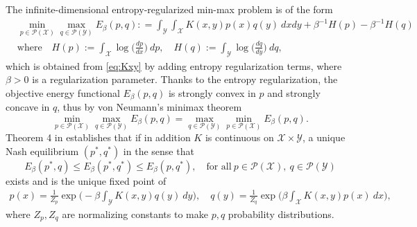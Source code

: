 \documentclass[11pt]{article}
\newcommand{\1}{\mathds{1}}
\begin{document}
The infinite-dimensional entropy-regularized min-max problem is of the form
\begin{equation}\label{obj:entropy}
\begin{aligned}
    &\min_{p\in\mathcal{P}(\mathcal{X})} \max_{q\in\mathcal{P}(\mathcal{Y})} E_{\beta} (p, q): =\int_{\mathcal{Y}} \int_{\mathcal{X}} K(x,y) p(x) q(y) ~dx dy + \beta^{-1} H(p)- \beta^{-1} H(q)\\
    &\text{where}\quad H(p):=\int_{\mathcal{X}}\log \Big(\frac{dp}{dx}\Big) ~dp, \quad  H(q):=\int_{\mathcal{Y}}\log \Big(\frac{dq}{dy}\Big) ~dq,
\end{aligned}
\end{equation}
which is obtained from \eqref{eq:Kxy} by adding entropy regularization terms, where
$\beta > 0$ is a regularization parameter.  Thanks to the entropy
regularization, the objective energy functional $E_{\beta}(p, q)$ is
strongly convex in $p$ and strongly concave in $q$, thus by von
Neumann's minimax theorem
 \begin{equation}
   \min_{p\in\mathcal{P}(\mathcal{X})} \max_{q\in\mathcal{P}(\mathcal{Y})} E_{\beta} (p, q) =  \max_{q\in\mathcal{P}(\mathcal{Y})} \min_{p\in\mathcal{P}(\mathcal{X})} E_{\beta} (p, q).
 \end{equation}
 Theorem 4 in \cite{domingo2020mean} establishes that if in addition
 $K$ is continuous on $\mathcal{X}\times \mathcal{Y}$, a unique Nash
 equilibrium $(p^*, q^*)$ in the sense that
\begin{equation*}
    E_\beta(p^*,q)\leq E_\beta(p^*,q^*)\leq E_\beta(p,q^*),\quad \text{for all}~p\in\mathcal{P}(\mathcal{X}),~ q\in \mathcal{P}(\mathcal{Y})
\end{equation*}
exists and is the unique fixed point of 
\begin{equation}
    \begin{aligned}
        p(x) = \frac{1}{Z_p}\exp\Big(-\beta\int_{\mathcal{Y}} K(x,y) q(y) ~dy \Big),
        \quad  q(y) =  \frac{1}{Z_q}\exp\Big(\beta\int_{\mathcal{X}} K(x,y) p(x) ~dx \Big),
    \end{aligned}
\end{equation}
where $Z_p, Z_q$ are normalizing constants to make $p, q$ probability distributions.
\end{document}
